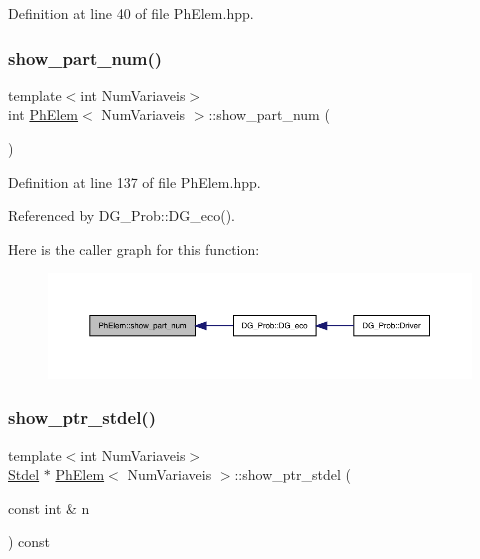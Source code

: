 Definition at line 40 of file Ph\+Elem.\+hpp.

\mbox{\label{classPhElem_a7a476e9682accd03064f3e8bec39fb50}} 
\subsubsection{\texorpdfstring{show\+\_\+part\+\_\+num()}{show\_part\_num()}}
{\footnotesize\ttfamily template$<$int Num\+Variaveis$>$ \\
int \hyperlink{classPhElem}{Ph\+Elem}$<$ Num\+Variaveis $>$\+::show\+\_\+part\+\_\+num (\begin{DoxyParamCaption}{ }\end{DoxyParamCaption})\hspace{0.3cm}{\ttfamily [inline]}}



Definition at line 137 of file Ph\+Elem.\+hpp.



Referenced by D\+G\+\_\+\+Prob\+::\+D\+G\+\_\+eco().

Here is the caller graph for this function\+:
\nopagebreak
\begin{figure}[H]
\begin{center}
\leavevmode
\includegraphics[width=350pt]{classPhElem_a7a476e9682accd03064f3e8bec39fb50_icgraph}
\end{center}
\end{figure}
\mbox{\label{classPhElem_a227c31195c6832f8e36f8d507806bd54}} 
\subsubsection{\texorpdfstring{show\+\_\+ptr\+\_\+stdel()}{show\_ptr\_stdel()}}
{\footnotesize\ttfamily template$<$int Num\+Variaveis$>$ \\
\hyperlink{classStdel}{Stdel} $\ast$ \hyperlink{classPhElem}{Ph\+Elem}$<$ Num\+Variaveis $>$\+::show\+\_\+ptr\+\_\+stdel (\begin{DoxyParamCaption}\item[{const int \&}]{n }\end{DoxyParamCaption}) const}



